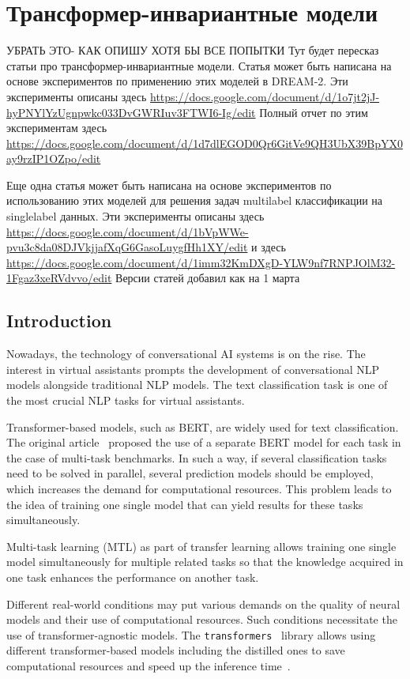 \chapter{Трансформер-инвариантные модели}\label{ch:tr-ag}
УБРАТЬ ЭТО- КАК ОПИШУ ХОТЯ БЫ ВСЕ ПОПЫТКИ
Тут будет пересказ статьи про трансформер-инвариантные модели. 
Статья может быть написана на основе экспериментов по применению этих моделей в DREAM-2. Эти эксперименты описаны здесь \url{https://docs.google.com/document/d/1o7jt2jJ-hyPNYlYzUgnpwkc033DvGWRIuv3FTWI6-Ig/edit}
Полный отчет по этим экспериментам здесь \url{https://docs.google.com/document/d/1d7dlEGOD0Qr6GitVe9QH3UbX39BpYX0ay9rzIP1OZpo/edit}

Еще одна статья может быть написана на основе экспериментов по использованию этих моделей для решения задач multilabel классификации на singlelabel данных. Эти эксперименты описаны здесь
\url{https://docs.google.com/document/d/1bVpWWe-pvu3c8da08DJVkjjafXqG6GasoLuygfHh1XY/edit}
и здесь 
\url{https://docs.google.com/document/d/1imm32KmDXgD-YLW9nf7RNPJOlM32-1Fgaz3xeRVdvvo/edit}
Версии статей добавил как на 1 марта
\iffalse
\section{Introduction}
Nowadays, the technology of conversational AI systems is on the rise. The interest in virtual assistants prompts the development of conversational NLP models alongside traditional NLP models. The text classification task is one of the most crucial NLP tasks for virtual assistants.

Transformer-based models, such as BERT, are widely used for text classification. The original article~\cite{bert} proposed the use of a separate BERT model for each task in the case of multi-task benchmarks. In such a way, if several classification tasks need to be solved in parallel, several prediction models should be employed, which increases the demand for computational resources. This problem leads to the idea of training one single model that can yield results for these tasks simultaneously. 

Multi-task learning (MTL) as part of transfer learning allows training one single model simultaneously for multiple related tasks so that the knowledge acquired in one task enhances the performance on another task.

Different real-world conditions may put various demands on the quality of neural models and their use of computational resources. Such conditions necessitate the use of transformer-agnostic models. The \texttt{transformers}~\cite{huggingface_transformers} library allows using different transformer-based models including the distilled ones to save computational resources and speed up the inference time~\cite{alina}. 


